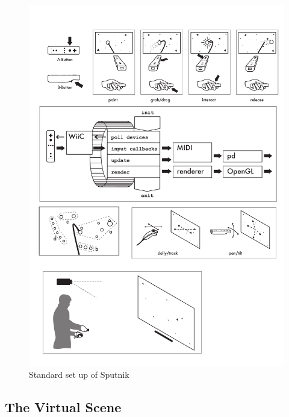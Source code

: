 \documentclass[10pt,a4paper]{scrartcl}
\begin{document}
\begin{figure}[hbtp]
\begin{center}
\includegraphics[width=0.7\columnwidth]{img/setup}
\caption{Standard set up of Sputnik}
\label{fig:sputnik-setup}
\end{center}
\end{figure}




\subsection{The Virtual Scene}
\end{document}
